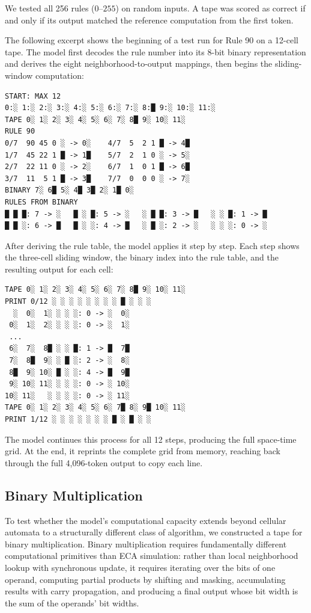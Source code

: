 \documentclass[twocolumn,switch,10pt]{article}
\begin{document}
We tested all 256 rules (\(0\)--\(255\)) on random inputs. A tape was scored as correct if and only if its output matched the reference computation from the first token.

The following excerpt shows the beginning of a test run for Rule 90 on a 12-cell tape. The model first decodes the rule number into its 8-bit binary representation and derives the eight neighborhood-to-output mappings, then begins the sliding-window computation:

\begin{verbatim}
START: MAX 12
0:░ 1:░ 2:░ 3:░ 4:░ 5:░ 6:░ 7:░ 8:█ 9:░ 10:░ 11:░
TAPE 0░ 1░ 2░ 3░ 4░ 5░ 6░ 7░ 8█ 9░ 10░ 11░
RULE 90
0/7  90 45 0 ░ -> 0░    4/7  5  2 1 █ -> 4█
1/7  45 22 1 █ -> 1█    5/7  2  1 0 ░ -> 5░
2/7  22 11 0 ░ -> 2░    6/7  1  0 1 █ -> 6█
3/7  11  5 1 █ -> 3█    7/7  0  0 0 ░ -> 7░
BINARY 7░ 6█ 5░ 4█ 3█ 2░ 1█ 0░
RULES FROM BINARY
█ █ █: 7 -> ░   █ ░ █: 5 -> ░   ░ █ █: 3 -> █   ░ ░ █: 1 -> █
█ █ ░: 6 -> █   █ ░ ░: 4 -> █   ░ █ ░: 2 -> ░   ░ ░ ░: 0 -> ░
\end{verbatim}

After deriving the rule table, the model applies it step by step. Each step shows the three-cell sliding window, the binary index into the rule table, and the resulting output for each cell:

\begin{verbatim}
TAPE 0░ 1░ 2░ 3░ 4░ 5░ 6░ 7░ 8█ 9░ 10░ 11░
PRINT 0/12 ░ ░ ░ ░ ░ ░ ░ ░ █ ░ ░ ░
  ░  0░  1░ ░ ░ ░: 0 -> ░  0░
 0░  1░  2░ ░ ░ ░: 0 -> ░  1░
 ...
 6░  7░  8█ ░ ░ █: 1 -> █  7█
 7░  8█  9░ ░ █ ░: 2 -> ░  8░
 8█  9░ 10░ █ ░ ░: 4 -> █  9█
 9░ 10░ 11░ ░ ░ ░: 0 -> ░ 10░
10░ 11░   ░ ░ ░ ░: 0 -> ░ 11░
TAPE 0░ 1░ 2░ 3░ 4░ 5░ 6░ 7█ 8░ 9█ 10░ 11░
PRINT 1/12 ░ ░ ░ ░ ░ ░ ░ █ ░ █ ░ ░
\end{verbatim}

The model continues this process for all 12 steps, producing the full space-time grid. At the end, it reprints the complete grid from memory, reaching back through the full 4,096-token output to copy each line.

\subsection{Binary Multiplication}\label{sec:mult}

To test whether the model's computational capacity extends beyond cellular automata to a structurally different class of algorithm, we constructed a tape for binary multiplication. Binary multiplication requires fundamentally different computational primitives than ECA simulation: rather than local neighborhood lookup with synchronous update, it requires iterating over the bits of one operand, computing partial products by shifting and masking, accumulating results with carry propagation, and producing a final output whose bit width is the sum of the operands' bit widths.
\end{document}
